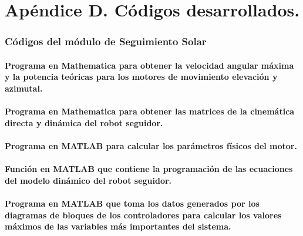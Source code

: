 \chapter{Apéndice D. Códigos desarrollados.}

\subsection{Códigos del módulo de Seguimiento Solar}

\subsubsection{Programa en Mathematica para obtener la velocidad angular máxima y la potencia teóricas para los motores de movimiento elevación y azimutal.}

%

\subsubsection{Programa en Mathematica para obtener las matrices de la cinemática directa y dinámica del robot seguidor.}

%

\subsubsection{Programa en MATLAB para calcular los parámetros físicos del motor.}

%

\subsubsection{Función en MATLAB que contiene la programación de las ecuaciones del modelo dinámico del robot seguidor.}

%

\subsubsection{Programa en MATLAB que toma los datos generados por los diagramas de bloques de los controladores para calcular los valores máximos de las variables más importantes del sistema.}

%

